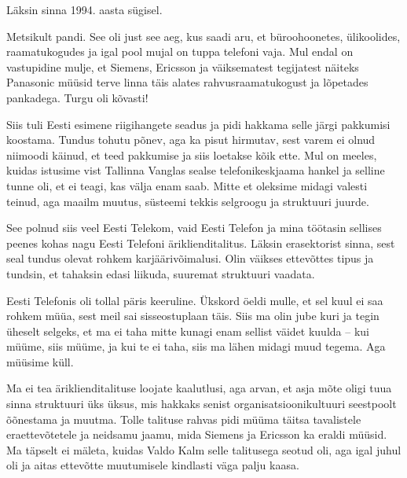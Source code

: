 Läksin sinna 1994. aasta sügisel. 


Metsikult pandi. See oli just see aeg, kus saadi aru, et büroohoonetes, 
ülikoolides, raamatukogudes ja igal pool mujal on tuppa telefoni vaja. 
Mul endal on vastupidine mulje, et Siemens, Ericsson ja 
väiksematest tegijatest näiteks Panasonic 
müüsid terve linna täis alates rahvusraamatukogust ja lõpetades 
pankadega. Turgu oli kõvasti! 

Siis tuli Eesti esimene riigihangete seadus ja
pidi hakkama selle järgi pakkumisi koostama. Tundus tohutu põnev, aga ka pisut 
hirmutav, sest varem ei olnud niimoodi käinud, et teed pakkumise ja siis 
loetakse kõik ette. Mul on meeles, kuidas istusime vist Tallinna Vanglas sealse  
telefonikeskjaama hankel ja selline tunne oli, et ei teagi, kas välja enam 
saab. Mitte et oleksime midagi valesti teinud, 
aga maailm muutus, süsteemi tekkis selgroogu ja struktuuri 
juurde.


See polnud siis veel Eesti Telekom, vaid Eesti Telefon ja 
mina töötasin sellises peenes kohas nagu Eesti Telefoni äriklienditalitus. Läksin erasektorist sinna, sest seal tundus 
olevat rohkem karjäärivõimalusi. Olin väikses ettevõttes tipus ja tundsin, et 
tahaksin edasi liikuda, suuremat struktuuri vaadata. 

Eesti Telefonis oli tollal päris keeruline. Ükskord öeldi mulle, et sel kuul ei saa rohkem müüa, sest meil sai 
sisseostuplaan täis. Siis ma olin jube kuri ja tegin üheselt selgeks, et ma ei 
taha mitte kunagi enam sellist väidet kuulda -- kui müüme, siis müüme, ja 
kui te ei taha, siis ma lähen midagi muud tegema. Aga müüsime küll.


Ma ei tea äriklienditalituse loojate kaalutlusi, aga arvan, et asja 
mõte oligi tuua sinna struktuuri üks üksus, mis hakkaks senist organisatsioonikultuuri seestpoolt õõnestama ja muutma. 
Tolle talituse rahvas pidi müüma täitsa tavalistele eraettevõtetele ja 
 neidsamu jaamu, mida Siemens ja Ericsson ka eraldi müüsid. Ma täpselt ei mäleta, kuidas Valdo Kalm selle 
talitusega seotud oli, aga igal juhul oli ja aitas
ettevõtte muutumisele kindlasti väga palju kaasa. 

